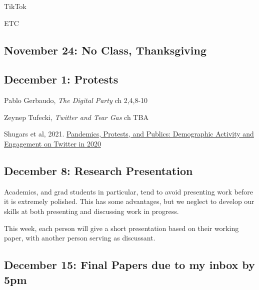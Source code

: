 \vspace{-.1in}\documentclass[11pt]{article}
\begin{document}
\noindent TikTok

\noindent ETC



\subsection*{November 24: No Class, Thanksgiving}

\subsection*{December 1:  Protests}

Pablo Gerbaudo, \textit{The Digital Party} ch 2,4,8-10

Zeynep Tufecki, \textit{Twitter and Tear Gas} ch TBA

\noindent Shugars et al, 2021. \href{https://journalqd.org/article/view/2570}{Pandemics, Protests, and Publics: Demographic Activity and Engagement on Twitter in 2020}




\subsection*{December 8: Research Presentation}

Academics, and grad students in particular, tend to avoid presenting work before it is extremely polished. This has some advantages, but we neglect to develop our skills at both presenting and discussing work in progress. 

This week, each person will give a short presentation based on their working paper, with another person serving as discussant.

\subsection*{December 15: Final Papers due to my inbox by 5pm}





\end{document}
